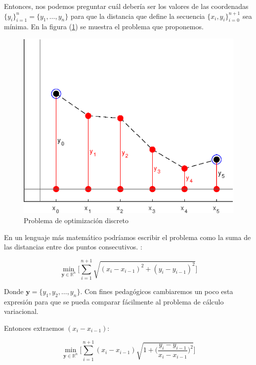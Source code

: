 Entonces, nos podemos preguntar cuál debería ser los valores de las coordenadas $ \{ y_i\}_{i=1}^{n} = \{y_1,\dots,y_n\}$ para que la distancia que define la secuencia $\{x_i,y_i\}_{i=0}^{n+1} $ sea mínima. En la figura (\ref{problema1}) se muestra el problema que proponemos.

\begin{figure}[]
    \centering
    \includegraphics[scale=0.6]{fig/img01.eps}
    \caption{Problema de optimización discreto}
    \label{problema1}
\end{figure}


En un lenguaje más matemático podríamos escribir el problema como la suma de las distancias entre dos puntos consecutivos.
: 

\begin{equation} 
    \min_{\bm{y} \in \mathbb{R}^n} \big[ \sum_{i=1}^{n+1}\sqrt{(x_i - x_{i-1})^2 + (y_i-y_{i-1})^2 }\big]
\end{equation}

Donde $\bm{y} = \{ y_1,y_2,\dots,y_n\}$. Con fines pedagógicos cambiaremos un poco esta expresión para que se pueda comparar fácilmente al problema de cálculo variacional. 

Entonces extraemos $(x_i - x_{i-1})$:


\begin{equation} 
    \min_{\bm{y} \in \mathbb{R}^n} \Bigg[ \sum_{i=1}^{n+1}  (x_i - x_{i-1}) \sqrt{1 + \Bigg( \frac{y_i-y_{i-1}}{x_i - x_{i-1}} \Bigg)^2 }\Bigg]
\end{equation}

